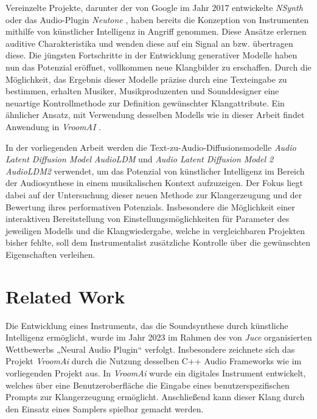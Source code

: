 \documentclass[
  a4paper,  %
  twoside,  %
  bibliography=totoc,
  headsepline,
  cleardoublepage=empty,
  parskip=half,
  draft=false
]{scrbook}
\begin{document}
Vereinzelte Projekte, darunter der von Google im Jahr 2017 entwickelte \emph{NSynth} \cite{google_ai_nsynth_2017} oder das Audio-Plugin \emph{Neutone} \cite{qosmo_neutone_nodate}, haben bereits die Konzeption von Instrumenten mithilfe von künstlicher Intelligenz in Angriff genommen. Diese Ansätze erlernen auditive Charakteristika und wenden diese auf ein Signal an bzw. übertragen diese. Die jüngsten Fortschritte in der Entwicklung generativer Modelle haben nun das Potenzial eröffnet, vollkommen neue Klangbilder zu erschaffen. Durch die Möglichkeit, das Ergebnis dieser Modelle präzise durch eine Texteingabe zu bestimmen, erhalten Musiker, Musikproduzenten und Sounddesigner eine neuartige Kontrollmethode zur Definition gewünschter Klangattribute. Ein ähnlicher Ansatz, mit Verwendung desselben Modells wie in dieser Arbeit findet Anwendung in \emph{VroomAI} \cite{barney_hill_vroomai_2023}.

In der vorliegenden Arbeit werden die Text-zu-Audio-Diffusionsmodelle \emph{Audio Latent Diffusion Model} \emph{AudioLDM}\cite{liu_audioldm_2023} und  \emph{Audio Latent Diffusion Model 2} \emph{AudioLDM2}\cite{liu_audioldm2_2023} verwendet, um das Potenzial von künstlicher Intelligenz im Bereich der Audiosynthese in einem musikalischen Kontext aufzuzeigen. Der Fokus liegt dabei auf der Untersuchung dieser neuen Methode zur Klangerzeugung und der Bewertung ihres performativen Potenzials. Insbesondere die Möglichkeit einer interaktiven Bereitstellung von Einstellungsmöglichkeiten für Parameter des jeweiligen Modells und die Klangwiedergabe, welche in vergleichbaren Projekten bisher fehlte, soll dem Instrumentalist zusätzliche Kontrolle über die gewünschten Eigenschaften verleihen.


\chapter{Related Work}


Die Entwicklung eines Instruments, das die Soundsynthese durch künstliche Intelligenz ermöglicht, wurde im Jahr 2023 im Rahmen des von \emph{Juce} \cite{noauthor_juce_nodate} organisierten Wettbewerbs „Neural Audio Plugin“ verfolgt. Insbesondere zeichnete sich das Projekt \emph{VroomAi} \cite{barney_hill_vroomai_2023} durch die Nutzung desselben C++ Audio Frameworks wie im vorliegenden Projekt aus. In \emph{VroomAi} wurde ein digitales Instrument entwickelt, welches über eine Benutzeroberfläche die Eingabe eines benutzerspezifischen Prompts zur Klangerzeugung ermöglicht. Anschließend kann dieser Klang durch den Einsatz eines Samplers spielbar gemacht werden.
\end{document}
